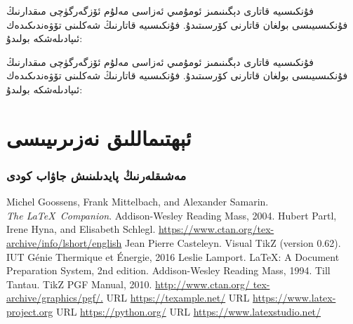 \documentclass[a4paper,openany]{book}
\begin{document}
\begin{colorful}[teal]
	فۇنكىسىيە قاتارى دېگىنىمىز ئومۇمىي ئەزاسى مەلۇم ئۆزگەرگۈچى مىقدارنىڭ فۇنكىسىيىسى بولغان قاتارنى كۆرسىتىدۇ. فۇنكىسىيە قاتارنىڭ شەكلىنى تۆۋەندىكىدەك ئىپادىلەشكە بولىدۇ:
\end{colorful} 

\begin{colorful}[purple]
	فۇنكىسىيە قاتارى دېگىنىمىز ئومۇمىي ئەزاسى مەلۇم ئۆزگەرگۈچى مىقدارنىڭ فۇنكىسىيىسى بولغان قاتارنى كۆرسىتىدۇ. فۇنكىسىيە قاتارنىڭ شەكلىنى تۆۋەندىكىدەك ئىپادىلەشكە بولىدۇ:
\end{colorful} 

\part{ئېھتىماللىق نەزىرىيىسى}

%
%
%



\newpage
\setcounter{page}{1}
%



\newpage
\section*{مەشىقلەرنىڭ پايدىلىنىش جاۋاب كودى}

\newpage
%





\begin{thebibliography}{9}
\begin{english}
	\textenglish{
	Michel Goossens, Frank Mittelbach, and Alexander Samarin. \\
	\textit{The \LaTeX\ Companion}. 
	Addison-Wesley Reading Mass, 2004.
	}
	\textenglish{
	Hubert Partl, Irene Hyna, and Elisabeth Schlegl. 
	\url{https://www.ctan.org/tex-archive/info/lshort/english}
	}
	\textenglish{
	Jean Pierre Casteleyn. Visual TikZ (version 0.62). IUT Génie Thermique et
Énergie, 2016
	}
	\textenglish{
	Leslie Lamport. \LaTeX: A Document Preparation System, 2nd edition.
Addison-Wesley Reading Mass, 1994.
	}
	\textenglish{
	Till Tantau. TikZ PGF Manual, 2010. \url{http://www.ctan.org/
tex-archive/graphics/pgf/.}
	}
	\textenglish{
	URL \url{https://texample.net/}
	}
	\textenglish{
	URL \url{https://www.latex-project.org}
	}
	\textenglish{
	URL \url{https://python.org/}
	}
	\textenglish{
	URL \url{https://www.latexstudio.net/}
	}
\end{english}
\end{thebibliography}
\end{document}

